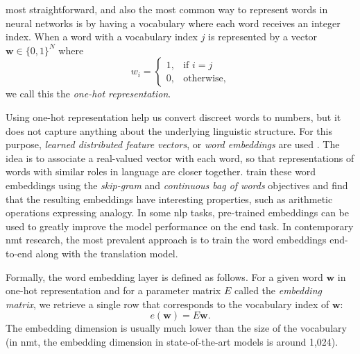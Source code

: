 most straightforward, and also the most common way to represent words in neural
networks is by having a vocabulary where each word receives an integer index.
When a word with a vocabulary index $j$ is represented by a vector $\mathbf{w}
\in \{0,1\}^N$ where
%
\begin{equation} w_i =
\begin{cases} 1, & \text{if } i = j \\ 0, & \text{otherwise,}
\end{cases}
\end{equation}
%
we call this the \emph{one-hot representation}.

Using one-hot representation help us convert discreet words to numbers, but it
does not capture anything about the underlying linguistic structure.  For this
purpose, \emph{learned distributed feature vectors}, or \emph{word embeddings}
are used \citep{bengio2003neural} . The idea is to
associate a real-valued vector with each word, so that representations of words
with similar roles in language are closer
together. \citet{mikolov2013distributed} train these word embeddings using the
\emph{skip-gram} and \emph{continuous bag of words} objectives and find that
the resulting embeddings have interesting properties, such as arithmetic
operations expressing analogy.  In some \gls{nlp} tasks, pre-trained embeddings
can be used to greatly improve the model performance on the end task. In
contemporary \gls{nmt} research, the most prevalent approach is to train the
word embeddings end-to-end along with the translation
model.

 Formally, the word embedding layer is defined as follows. For a
given word $\textbf{w}$ in one-hot representation and for a parameter matrix
$E$ called the \emph{embedding matrix}, we retrieve a single row that
corresponds to the vocabulary index of $\mathbf{w}$:
%
\begin{equation}
  e(\mathbf{w}) = E\mathbf{w}.
\end{equation}
%
The embedding dimension is usually much lower than the size of the vocabulary
(in \gls{nmt}, the embedding dimension in state-of-the-art models is around
1,024).



